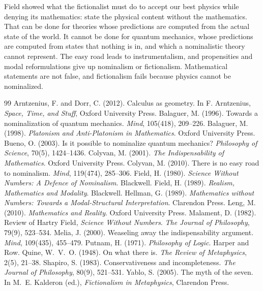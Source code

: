 \documentclass{situationist-preprint}
\begin{document}
Field showed what the fictionalist must do to accept our best physics while denying its mathematics: state the physical content without the mathematics. That can be done for theories whose predictions are computed from the actual state of the world. It cannot be done for quantum mechanics, whose predictions are computed from states that nothing is in, and which a nominalistic theory cannot represent. The easy road leads to instrumentalism, and propensities and modal reformulations give up nominalism or fictionalism. Mathematical statements are not false, and fictionalism fails because physics cannot be nominalized.

\begin{thebibliography}{99}\small
{} Arntzenius, F. and Dorr, C. (2012). Calculus as geometry. In F. Arntzenius, \emph{Space, Time, and Stuff}, Oxford University Press.
 Balaguer, M. (1996). Towards a nominalization of quantum mechanics. \emph{Mind}, 105(418), 209--226.
 Balaguer, M. (1998). \emph{Platonism and Anti-Platonism in Mathematics}. Oxford University Press.
 Bueno, O. (2003). Is it possible to nominalize quantum mechanics? \emph{Philosophy of Science}, 70(5), 1424--1436.
 Colyvan, M. (2001). \emph{The Indispensability of Mathematics}. Oxford University Press.
 Colyvan, M. (2010). There is no easy road to nominalism. \emph{Mind}, 119(474), 285--306.
 Field, H. (1980). \emph{Science Without Numbers: A Defence of Nominalism}. Blackwell.
 Field, H. (1989). \emph{Realism, Mathematics and Modality}. Blackwell.
 Hellman, G. (1989). \emph{Mathematics without Numbers: Towards a Modal-Structural Interpretation}. Clarendon Press.
 Leng, M. (2010). \emph{Mathematics and Reality}. Oxford University Press.
 Malament, D. (1982). Review of Hartry Field, \emph{Science Without Numbers}. \emph{The Journal of Philosophy}, 79(9), 523--534.
 Melia, J. (2000). Weaseling away the indispensability argument. \emph{Mind}, 109(435), 455--479.
 Putnam, H. (1971). \emph{Philosophy of Logic}. Harper and Row.
 Quine, W.~V.~O. (1948). On what there is. \emph{The Review of Metaphysics}, 2(5), 21--38.
 Shapiro, S. (1983). Conservativeness and incompleteness. \emph{The Journal of Philosophy}, 80(9), 521--531.
 Yablo, S. (2005). The myth of the seven. In M.~E. Kalderon (ed.), \emph{Fictionalism in Metaphysics}, Clarendon Press.
\end{thebibliography}
\end{document}
